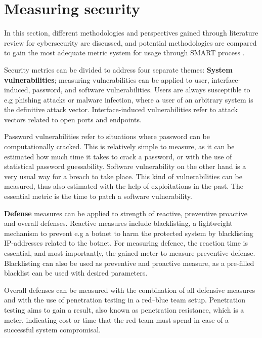 \section{Measuring security} \label{measuringsecurity}

In this section, different methodologies and perspectives gained
through literature review for cybersecurity are discussed, and
potential methodologies are compared to gain the most adequate metric
system for usage through SMART process \cite{payne2006guide}.

Security metrics can be divided to address four separate themes:
\textbf{System vulnerabilities}; measuring vulnerabilities can be
applied to user, interface-induced, password, and software
vulnerabilities. Users are always susceptible to e.g phishing attacks
or malware infection, where a user of an arbitrary system is the
definitive attack vector. Interface-induced vulnerabilities refer to
attack vectors related to open ports and
endpoints. \cite{pendleton2016survey}

Password vulnerabilities refer to situations where password can be
computationally cracked. This is relatively simple to measure, as it
can be estimated how much time it takes to crack a password, or with
the use of statistical password guessability. Software vulnerability
on the other hand is a very usual way for a breach to take
place. This kind of vulnerabilities can be measured, thus also
estimated with the help of exploitations in the past. The
essential metric is the time to patch a software vulnerability. \cite{pendleton2016survey}

\textbf{Defense} measures can be applied to strength of reactive,
preventive proactive and overall defenses. Reactive measures include
blacklisting, a lightweight mechanism to prevent e.g a botnet to harm
the protected system by blacklisting IP-addresses related to the
botnet. For measuring defence, the reaction time is essential, and
most importantly, the gained meter to measure preventive
defense. Blacklisting can also be used as preventive and proactive
measure, as a pre-filled blacklist can be used with desired
parameters. \cite{pendleton2016survey ramos2017model}

Overall defenses can be measured with the combination of all defensive
measures and with the use of penetration testing in a red–blue team
setup. Penetration testing aims to gain a result, also known as
penetration resistance, which is a meter, indicating cost or time that
the red team must spend in case of a successful system
compromisal. \cite{pendleton2016survey ramos2017model}

